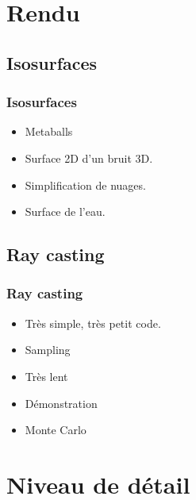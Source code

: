 \documentclass{beamer}
\begin{document}
\section{Rendu}

\subsection{Isosurfaces}
\begin{frame}
  \frametitle{Isosurfaces}
  \begin{itemize}
    \item Metaballs %
    \item Surface 2D d'un bruit 3D.
    \item Simplification de nuages.
    \item Surface de l'eau.
  \end{itemize}
\end{frame}

\subsection{Ray casting}

\begin{frame}
  \frametitle{Ray casting}
  \begin{itemize}
  \item Très simple, très petit code.
  \item Sampling
  \item Très lent
  \item Démonstration
  \item Monte Carlo
  \end{itemize}
\end{frame}

\section[LOD]{Niveau de détail}
\end{document}

